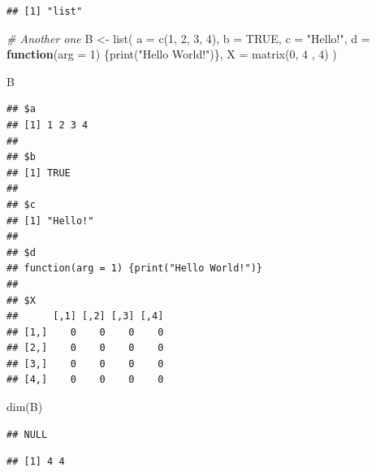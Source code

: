 \documentclass[
]{book}
\newenvironment{Shaded}{\begin{snugshade}}{\end{snugshade}}
\newcommand{\AttributeTok}[1]{\textcolor[rgb]{0.77,0.63,0.00}{#1}}
\newcommand{\CommentTok}[1]{\textcolor[rgb]{0.56,0.35,0.01}{\textit{#1}}}
\newcommand{\ConstantTok}[1]{\textcolor[rgb]{0.00,0.00,0.00}{#1}}
\newcommand{\ControlFlowTok}[1]{\textcolor[rgb]{0.13,0.29,0.53}{\textbf{#1}}}
\newcommand{\DecValTok}[1]{\textcolor[rgb]{0.00,0.00,0.81}{#1}}
\newcommand{\FunctionTok}[1]{\textcolor[rgb]{0.00,0.00,0.00}{#1}}
\newcommand{\NormalTok}[1]{#1}
\newcommand{\OtherTok}[1]{\textcolor[rgb]{0.56,0.35,0.01}{#1}}
\newcommand{\SpecialCharTok}[1]{\textcolor[rgb]{0.00,0.00,0.00}{#1}}
\newcommand{\StringTok}[1]{\textcolor[rgb]{0.31,0.60,0.02}{#1}}
\theoremstyle{definition}
\theoremstyle{definition}
\theoremstyle{definition}
\theoremstyle{definition}
\theoremstyle{remark}
\begin{document}
\begin{verbatim}
## [1] "list"
\end{verbatim}

\begin{Shaded}
\begin{Highlighting}[]
\CommentTok{\# Another one}
\NormalTok{B }\OtherTok{\textless{}{-}} \FunctionTok{list}\NormalTok{(}
          \AttributeTok{a =} \FunctionTok{c}\NormalTok{(}\DecValTok{1}\NormalTok{, }\DecValTok{2}\NormalTok{, }\DecValTok{3}\NormalTok{, }\DecValTok{4}\NormalTok{),}
          \AttributeTok{b =} \ConstantTok{TRUE}\NormalTok{,}
          \AttributeTok{c =} \StringTok{"Hello!"}\NormalTok{,}
          \AttributeTok{d =} \ControlFlowTok{function}\NormalTok{(}\AttributeTok{arg =} \DecValTok{1}\NormalTok{) \{}\FunctionTok{print}\NormalTok{(}\StringTok{"Hello World!"}\NormalTok{)\},}
          \AttributeTok{X =} \FunctionTok{matrix}\NormalTok{(}\DecValTok{0}\NormalTok{, }\DecValTok{4}\NormalTok{ , }\DecValTok{4}\NormalTok{)}
\NormalTok{)}

\NormalTok{B}
\end{Highlighting}
\end{Shaded}

\begin{verbatim}
## $a
## [1] 1 2 3 4
## 
## $b
## [1] TRUE
## 
## $c
## [1] "Hello!"
## 
## $d
## function(arg = 1) {print("Hello World!")}
## 
## $X
##      [,1] [,2] [,3] [,4]
## [1,]    0    0    0    0
## [2,]    0    0    0    0
## [3,]    0    0    0    0
## [4,]    0    0    0    0
\end{verbatim}

\begin{Shaded}
\begin{Highlighting}[]
\FunctionTok{dim}\NormalTok{(B)}
\end{Highlighting}
\end{Shaded}

\begin{verbatim}
## NULL
\end{verbatim}

\begin{Shaded}
\end{Shaded}

\begin{verbatim}
## [1] 4 4
\end{verbatim}
\end{document}
